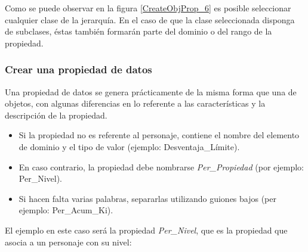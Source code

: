 Como se puede observar en la figura \ref*{CreateObjProp_6} es posible seleccionar cualquier clase de la jerarquía. En el 
caso de que la clase seleccionada disponga de subclases, éstas también formarán parte del dominio o del rango de la propiedad.\medskip

\subsubsection{Crear una propiedad de datos}\label{CreateDataProp}
Una propiedad de datos se genera prácticamente de la misma forma que una de objetos, con algunas diferencias en lo referente 
a las características y la descripción de la propiedad. 

\begin{itemize}
    \item Si la propiedad no es referente al personaje, contiene el nombre del elemento de dominio y el tipo de valor 
    (ejemplo: Desventaja\_Límite).
    \item En caso contrario, la propiedad debe nombrarse \textit{Per\_Propiedad} (por ejemplo: Per\_Nivel).
    \item Si hacen falta varias palabras, separarlas utilizando guiones bajos (per ejemplo: Per\_Acum\_Ki).
\end{itemize}

El ejemplo en este caso será la propiedad \textit{Per\_Nivel}, que es 
la propiedad que asocia a un personaje con su nivel:

